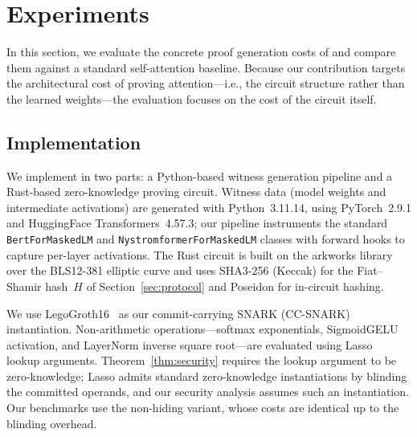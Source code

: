 \section{Experiments}
\label{sec:experiments}

In this section, we evaluate the concrete proof generation costs of \name and compare them against a standard self-attention baseline. Because our contribution targets the architectural cost of proving attention---i.e., the circuit structure rather than the learned weights---the evaluation focuses on the cost of the circuit itself. 

\subsection{Implementation}
We implement \name in two parts: a Python-based witness generation pipeline and a Rust-based zero-knowledge proving circuit. Witness data (model weights and intermediate activations) are generated with Python~3.11.14, using PyTorch~2.9.1 and HuggingFace Transformers~4.57.3; our pipeline instruments the standard \texttt{BertForMaskedLM} and \texttt{NystromformerForMaskedLM} classes with forward hooks to capture per-layer activations.  The Rust circuit is built on the arkworks library over the BLS12-381 elliptic curve and uses SHA3-256 (Keccak) for the Fiat--Shamir hash~$H$ of Section~\ref{sec:protocol} and Poseidon for in-circuit hashing.

We use LegoGroth16~\cite{Legosnark} as our commit-carrying SNARK (CC-SNARK) instantiation.  Non-arithmetic operations---softmax exponentials, SigmoidGELU activation, and LayerNorm inverse square root---are evaluated using Lasso~\cite{Lasso} lookup arguments. Theorem~\ref{thm:security} requires the lookup argument to be zero-knowledge; Lasso admits standard zero-knowledge instantiations by blinding the committed operands, and our security analysis assumes such an instantiation. Our benchmarks use the non-hiding variant, whose costs are identical up to the blinding overhead.

